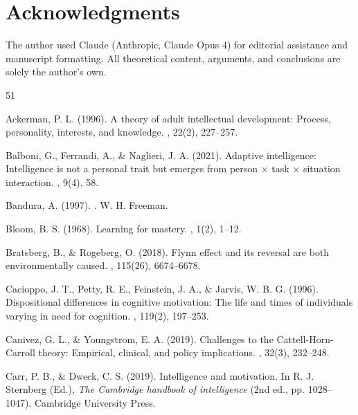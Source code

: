 \documentclass[12pt,a4paper]{article}
\begin{document}
\section*{Acknowledgments}

The author used Claude (Anthropic, Claude Opus 4) for editorial assistance and manuscript formatting. All theoretical content, arguments, and conclusions are solely the author's own.


\begin{thebibliography}{51}

Ackerman, P. L. (1996).
\newblock A theory of adult intellectual development: Process, personality, interests, and knowledge.
, 22(2), 227--257.

Balboni, G., Ferrandi, A., \& Naglieri, J. A. (2021).
\newblock Adaptive intelligence: Intelligence is not a personal trait but emerges from person × task × situation interaction.
, 9(4), 58.

Bandura, A. (1997).
.
\newblock W. H. Freeman.

Bloom, B. S. (1968).
\newblock Learning for mastery.
, 1(2), 1--12.

Bratsberg, B., \& Rogeberg, O. (2018).
\newblock Flynn effect and its reversal are both environmentally caused.
, 115(26), 6674--6678.

Cacioppo, J. T., Petty, R. E., Feinstein, J. A., \& Jarvis, W. B. G. (1996).
\newblock Dispositional differences in cognitive motivation: The life and times of individuals varying in need for cognition.
, 119(2), 197--253.

Canivez, G. L., \& Youngstrom, E. A. (2019).
\newblock Challenges to the Cattell-Horn-Carroll theory: Empirical, clinical, and policy implications.
, 32(3), 232--248.

Carr, P. B., \& Dweck, C. S. (2019).
\newblock Intelligence and motivation.
\newblock In R. J. Sternberg (Ed.), {\em The Cambridge handbook of intelligence} (2nd ed., pp. 1028--1047). Cambridge University Press.


\end{thebibliography}
\end{document}
